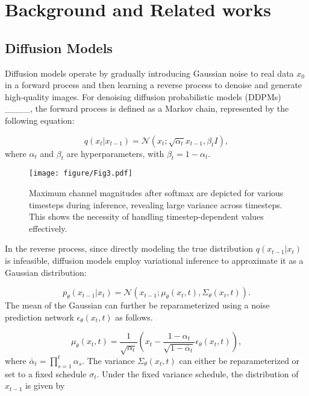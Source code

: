 \section{Background and Related works}
\label{sec:background}

\subsection{Diffusion Models}
\label{ssec:DM}
Diffusion models operate by gradually introducing Gaussian noise to real data $x_0$ in a forward process and then learning a reverse process to denoise and generate high-quality images. For denoising diffusion probabilistic models (DDPMs) ____, the forward process is defined as a Markov chain, represented by the following equation:

\begin{equation}
q(x_t | x_{t-1}) = \mathcal{N}(x_t; \sqrt{\alpha_t} x_{t-1}, \beta_t I),
\end{equation}
where $\alpha_t$ and $\beta_t$ are hyperparameters, with $\beta_t = 1 - \alpha_t$. 

\begin{figure}
    \centering
    \texttt{[image: figure/Fig3.pdf]}
    \caption{Maximum channel magnitudes after softmax are depicted for various timesteps during inference, revealing large variance across timesteps. This shows the necessity of handling timestep-dependent values effectively.
    } \label{fig3}
\end{figure}

In the reverse process, since directly modeling the true distribution $q(x_{t-1}|x_t)$ is infeasible, diffusion models employ variational inference to approximate it as a Gaussian distribution:

\begin{equation}
p_\theta(x_{t-1}|x_t) = \mathcal{N}(x_{t-1}; \mu_\theta(x_t, t), \Sigma_\theta(x_t, t)).
\end{equation}
The mean of the Gaussian can further be reparameterized using a noise prediction network $\epsilon_\theta(x_t, t)$ as follows.

\begin{equation}
\mu_\theta(x_t, t) = \frac{1}{\sqrt{\alpha_t}} \left( x_t - \frac{1 - \alpha_t}{\sqrt{1 - \bar{\alpha}_t}} \epsilon_\theta(x_t, t) \right),
\end{equation}
where $\bar{\alpha}_t = \prod_{s=1}^t \alpha_s$. The variance $\Sigma_\theta(x_t, t)$ can either be reparameterized or set to a fixed schedule $\sigma_t$. Under the fixed variance schedule, the distribution of $x_{t-1}$ is given by

